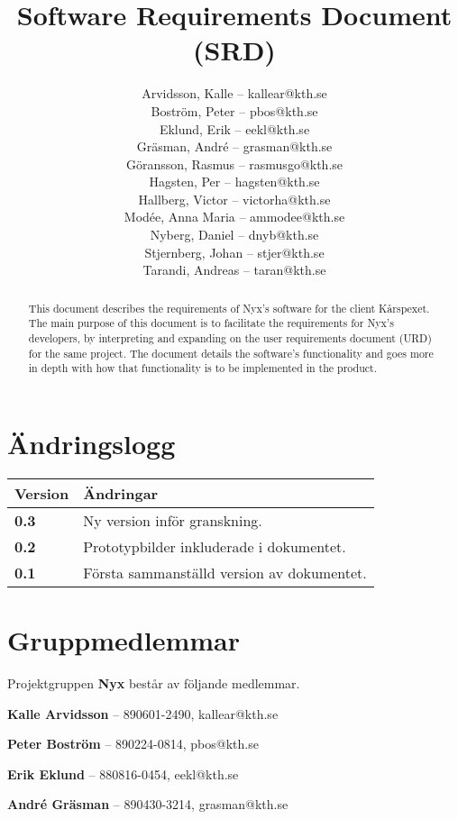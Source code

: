 \documentclass[a4paper, twoside, 11pt, titlepage]{article}
\author{
	\small
	Arvidsson, Kalle -- kallear@kth.se\\
	Boström, Peter -- pbos@kth.se\\
	Eklund, Erik -- eekl@kth.se\\
	Gräsman, André -- grasman@kth.se\\
	Göransson, Rasmus -- rasmusgo@kth.se\\
	Hagsten, Per -- hagsten@kth.se\\
	Hallberg, Victor -- victorha@kth.se\\
	Modée, Anna Maria -- ammodee@kth.se\\
	Nyberg, Daniel -- dnyb@kth.se\\
	Stjernberg, Johan -- stjer@kth.se\\
	Tarandi, Andreas -- taran@kth.se
	}
\title{Software Requirements Document (SRD)}
\begin{document}
\maketitle

\clearpage
\thispagestyle{empty}
\mbox{}
\newpage

\begin{abstract}
	This document describes the requirements of Nyx's software for the client Kårspexet. The main purpose of this document is to facilitate the requirements for Nyx's developers, by interpreting and expanding on the user requirements document (URD) for the same project. The document details the software's functionality and goes more in depth with how that functionality is to be implemented in the product.
\end{abstract}

\newpage

\setcounter{page}{1}

\startfooter

\clearpage
\section*{Ändringslogg}


\begin{tabular} { p{2.6cm} p{12.5cm} }
	\hline
	\sffamily\textbf{Version} & \sffamily\textbf{Ändringar } \\
	\hline
	\sffamily\textbf{0.3} & Ny version inför granskning.  \\
	\hline
	\sffamily\textbf{0.2} & Prototypbilder inkluderade i dokumentet.  \\
	\hline
	\sffamily\textbf{0.1} & Första sammanställd version av dokumentet.  \\
	\hline
\end{tabular}


\clearpage
\section*{Gruppmedlemmar}


Projektgruppen \textbf{Nyx} består av följande medlemmar.

\textbf{Kalle Arvidsson} -- 890601-2490, kallear@kth.se

\textbf{Peter Boström} -- 890224-0814, pbos@kth.se

\textbf{Erik Eklund} -- 880816-0454, eekl@kth.se 

\textbf{André Gräsman} -- 890430-3214, grasman@kth.se 
\end{document}

